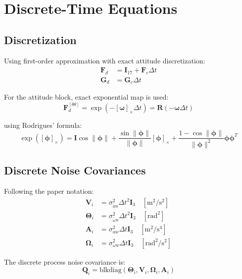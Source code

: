 \documentclass[11pt,a4paper]{article}
\newcommand{\I}{\mathbf{I}}
\renewcommand{\skew}[1]{\left[#1\right]_\times}
\begin{document}
\section{Discrete-Time Equations}

\subsection{Discretization}
Using first-order approximation with exact attitude discretization:
\begin{align}
    \mathbf{F}_d &= \I_{17} + \mathbf{F}_c \Delta t \\
    \mathbf{G}_d &= \mathbf{G}_c \Delta t
\end{align}

For the attitude block, exact exponential map is used:
\begin{equation}
    \mathbf{F}_d^{[\theta\theta]} = \exp\left(-\skew{\bm{\omega}} \Delta t\right) = \mathbf{R}(-\bm{\omega} \Delta t)
\end{equation}

using Rodrigues' formula:
\begin{equation}
    \exp(\skew{\bm{\phi}}) = \I \cos\|\bm{\phi}\| + \frac{\sin\|\bm{\phi}\|}{\|\bm{\phi}\|} \skew{\bm{\phi}} + \frac{1-\cos\|\bm{\phi}\|}{\|\bm{\phi}\|^2} \bm{\phi}\bm{\phi}^T
\end{equation}

\subsection{Discrete Noise Covariances}
Following the paper notation:
\begin{align}
    \mathbf{V}_i &= \sigma_{\tilde{a}n}^2 \Delta t^2 \I_3 \quad [\text{m}^2/\text{s}^2] \label{eq:Vi}\\
    \bm{\Theta}_i &= \sigma_{\tilde{\omega}n}^2 \Delta t^2 \I_3 \quad [\text{rad}^2] \label{eq:Thetai}\\
    \mathbf{A}_i &= \sigma_{aw}^2 \Delta t \I_3 \quad [\text{m}^2/\text{s}^4] \label{eq:Ai}\\
    \bm{\Omega}_i &= \sigma_{\omega w}^2 \Delta t \I_3 \quad [\text{rad}^2/\text{s}^2] \label{eq:Omegai}
\end{align}

The discrete process noise covariance is:
\begin{equation}
    \mathbf{Q}_i = \text{blkdiag}(\bm{\Theta}_i, \mathbf{V}_i, \bm{\Omega}_i, \mathbf{A}_i)
\end{equation}
\end{document}

